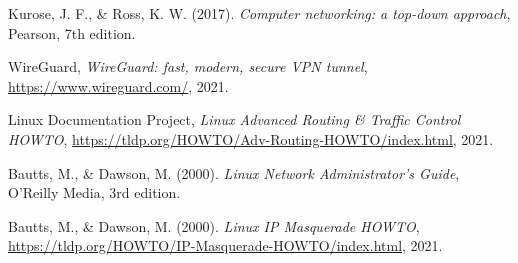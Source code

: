 
%

\backmatter@sglvgdor


\begin{thebibliography}{9}
  Kurose, J. F., \& Ross, K. W. (2017).
  \emph{Computer networking: a top-down approach},
  Pearson,
  7th edition.

    WireGuard,
    \emph{WireGuard: fast, modern, secure VPN tunnel},
    \url{https://www.wireguard.com/},
    2021.

    Linux Documentation Project,
    \emph{Linux Advanced Routing \& Traffic Control HOWTO},
    \url{https://tldp.org/HOWTO/Adv-Routing-HOWTO/index.html},
    2021.

    Bautts, M., \& Dawson, M. (2000).
    \emph{Linux Network Administrator's Guide},
    O'Reilly Media,
    3rd edition.


    Bautts, M., \& Dawson, M. (2000).
    \emph{Linux IP Masquerade HOWTO},
    \url{https://tldp.org/HOWTO/IP-Masquerade-HOWTO/index.html},
    2021.

\end{thebibliography}